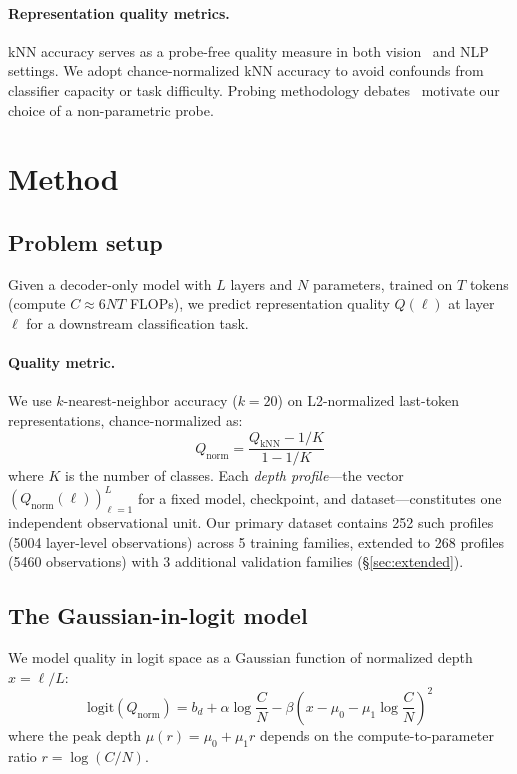 \documentclass{article}
\begin{document}
\paragraph{Representation quality metrics.}
kNN accuracy serves as a probe-free quality measure in both vision~\citep{wu2018unsupervised, caron2021emerging} and NLP settings. We adopt chance-normalized kNN accuracy to avoid confounds from classifier capacity or task difficulty. Probing methodology debates~\citep{hewitt2019control, belinkov2022probing} motivate our choice of a non-parametric probe.

\section{Method}
\label{sec:method}

\subsection{Problem setup}

Given a decoder-only model with $L$ layers and $N$ parameters, trained on $T$ tokens (compute $C \approx 6NT$ FLOPs), we predict representation quality $Q(\ell)$ at layer $\ell$ for a downstream classification task.

\paragraph{Quality metric.}
We use $k$-nearest-neighbor accuracy ($k=20$) on L2-normalized last-token representations, chance-normalized as:
\begin{equation}
    Q_{\text{norm}} = \frac{Q_{\text{kNN}} - 1/K}{1 - 1/K}
\end{equation}
where $K$ is the number of classes. Each \emph{depth profile}---the vector $(Q_{\text{norm}}(\ell))_{\ell=1}^L$ for a fixed model, checkpoint, and dataset---constitutes one independent observational unit. Our primary dataset contains 252 such profiles (5004 layer-level observations) across 5 training families, extended to 268 profiles (5460 observations) with 3 additional validation families (\S\ref{sec:extended}).

\subsection{The Gaussian-in-logit model}

We model quality in logit space as a Gaussian function of normalized depth $x = \ell / L$:
\begin{equation}
\label{eq:law}
    \text{logit}(Q_{\text{norm}}) = b_d + \alpha \log \frac{C}{N} - \beta \left(x - \mu_0 - \mu_1 \log \frac{C}{N}\right)^2
\end{equation}
where the peak depth $\mu(r) = \mu_0 + \mu_1 r$ depends on the compute-to-parameter ratio $r = \log(C/N)$.
\end{document}
